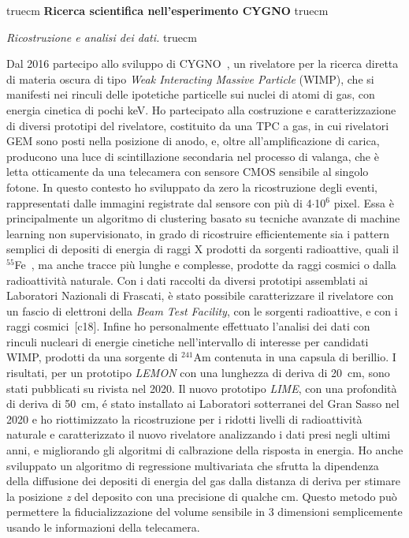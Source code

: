 \documentclass[11pt,twoside,a4paper]{article}
\begin{document}
 truecm
{\bf{Ricerca scientifica nell'esperimento CYGNO}}
 truecm

\textit{Ricostruzione e analisi dei dati.}
 truecm

Dal 2016 partecipo allo sviluppo di CYGNO~\cite{Pinci:2019ztr}, un
rivelatore per la ricerca diretta di materia oscura di tipo
\textit{Weak Interacting Massive Particle} (WIMP), che si manifesti
nei rinculi delle ipotetiche particelle sui nuclei di atomi di gas,
con energia cinetica di pochi keV. Ho partecipato alla costruzione e
caratterizzazione di diversi prototipi del rivelatore, costituito da
una TPC a gas, in cui rivelatori GEM sono posti nella posizione di
anodo, e, oltre all'amplificazione di carica, producono una luce di
scintillazione secondaria nel processo di valanga, che \`e letta
otticamente da una telecamera con sensore CMOS sensibile al singolo
fotone.  In questo contesto ho sviluppato da zero la ricostruzione
degli eventi, rappresentati dalle immagini registrate dal sensore con
pi\`u di 4$\cdot$10$^6$ pixel.  Essa \`e principalmente un algoritmo
di clustering basato su tecniche avanzate di machine learning non
supervisionato, in grado di ricostruire efficientemente sia i pattern
semplici di depositi di energia di raggi X prodotti da sorgenti
radioattive, quali il $^{55}$Fe~\cite{Costa_2019}, ma anche tracce
pi\`u lunghe e complesse, prodotte da raggi cosmici o dalla
radioattivit\`a naturale.  Con i dati raccolti da diversi prototipi
assemblati ai Laboratori Nazionali di Frascati, \`e stato possibile
caratterizzare il rivelatore con un fascio di elettroni della
\textit{Beam Test Facility}, con le sorgenti radioattive, e con i
raggi cosmici~[c18]. Infine ho personalmente effettuato l'analisi dei
dati con rinculi nucleari di energie cinetiche nell'intervallo di
interesse per candidati WIMP, prodotti da una sorgente di $^{241}$Am
contenuta in una capsula di berillio. I risultati, per un prototipo
\textit{LEMON} con una lunghezza di deriva di \SI{20}{cm}, sono stati
pubblicati su rivista nel 2020. Il nuovo prototipo \textit{LIME}, con
una profondit\`a di deriva di \SI{50}{cm}, \'e stato installato ai
Laboratori sotterranei del Gran Sasso nel 2020 e ho riottimizzato la
ricostruzione per i ridotti livelli di radioattivit\`a naturale e
caratterizzato il nuovo rivelatore analizzando i dati presi negli
ultimi anni, e migliorando gli algoritmi di calbrazione della risposta
in energia. Ho anche sviluppato un algoritmo di regressione
multivariata che sfrutta la dipendenza della diffusione dei depositi
di energia del gas dalla distanza di deriva per stimare la posizione
\textit{z} del deposito con una precisione di qualche cm. Questo
metodo pu\`o permettere la fiducializzazione del volume sensibile in 3
dimensioni semplicemente usando le informazioni della telecamera.
\end{document}
